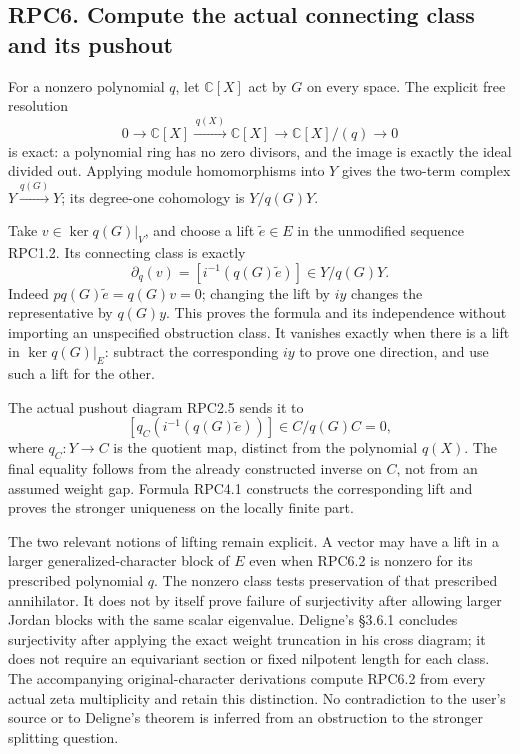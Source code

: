 \subsection{RPC6. Compute the actual connecting class and its
pushout}\label{rpc6.-compute-the-actual-connecting-class-and-its-pushout}

For a nonzero polynomial \(q\), let \(\mathbb C[X]\) act by \(G\) on
every space. The explicit free resolution \[
0\longrightarrow\mathbb C[X]\xrightarrow{\,q(X)\,}
\mathbb C[X]\longrightarrow\mathbb C[X]/(q)\longrightarrow0
\tag{RPC6.1}
\] is exact: a polynomial ring has no zero divisors, and the image is
exactly the ideal divided out. Applying module homomorphisms into \(Y\)
gives the two-term complex \(Y\xrightarrow{q(G)}Y\); its degree-one
cohomology is \(Y/q(G)Y\).

Take \(v\in\ker q(G)|_V\), and choose a lift \(\widetilde e\in E\) in
the unmodified sequence RPC1.2. Its connecting class is exactly \[
\partial_q(v)=[i^{-1}(q(G)\widetilde e)]\in Y/q(G)Y.
\tag{RPC6.2}
\] Indeed \(p q(G)\widetilde e=q(G)v=0\); changing the lift by \(iy\)
changes the representative by \(q(G)y\). This proves the formula and its
independence without importing an unspecified obstruction class. It
vanishes exactly when there is a lift in \(\ker q(G)|_E\): subtract the
corresponding \(iy\) to prove one direction, and use such a lift for the
other.

The actual pushout diagram RPC2.5 sends it to \[
[q_C(i^{-1}(q(G)\widetilde e))]\in C/q(G)C=0,
\tag{RPC6.3}
\] where \(q_C:Y\to C\) is the quotient map, distinct from the
polynomial \(q(X)\). The final equality follows from the already
constructed inverse on \(C\), not from an assumed weight gap. Formula
RPC4.1 constructs the corresponding lift and proves the stronger
uniqueness on the locally finite part.

The two relevant notions of lifting remain explicit. A vector may have a
lift in a larger generalized-character block of \(E\) even when RPC6.2
is nonzero for its prescribed polynomial \(q\). The nonzero class tests
preservation of that prescribed annihilator. It does not by itself prove
failure of surjectivity after allowing larger Jordan blocks with the
same scalar eigenvalue. Deligne's §3.6.1 concludes surjectivity after
applying the exact weight truncation in his cross diagram; it does not
require an equivariant section or fixed nilpotent length for each class.
The accompanying original-character derivations compute RPC6.2 from
every actual zeta multiplicity and retain this distinction. No
contradiction to the user's source or to Deligne's theorem is inferred
from an obstruction to the stronger splitting question.

